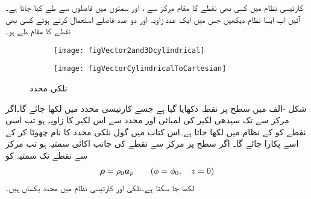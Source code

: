 کارتیسی نظام میں کسی بھی نقطے کا مقام مرکز سے ،  اور  سمتوں میں فاصلوں سے طے کیا جاتا ہے۔آئیں اب ایسا نظام دیکھیں جس میں ایک عدد زاویہ اور دو عدد فاصلے استعمال کرتے ہوئے کسی بھی نقطے کا مقام طے ہو۔
 \begin{figure}
\centering
\begin{subfigure}{0.5\textwidth}
\centering
\texttt{[image: figVector2and3Dcylindrical]}
\end{subfigure}%
%
\begin{subfigure}{0.5\textwidth}
\centering
\texttt{[image: figVectorCylindricalToCartesian]}
\end{subfigure}%
\caption{نلکی محدد}
\label{شکل_سمتیہ_نلکی_محدد}
\end{figure}

شکل -الف میں  سطح پر نقطہ  دکھایا گیا ہے جسے کارتیسی محدد میں  لکھا جائے گا۔اگر مرکز سے  تک سیدھی لکیر کی لمبائی  اور  محدد سے اس لکیر کا زاویہ  ہو تب اسی نقطے
 کو  کے نظام میں  لکھا جاتا ہے۔اس کتاب میں گول نلکی محدد کا نام چھوٹا کر کے اسے  پکارا جائے گا۔ اگر  سطح پر مرکز سے نقطے کی جانب اکائی سمتیہ  ہو تب مرکز سے نقطے تک سمتیہ کو
\begin{align}
{\ensuremath{{\boldsymbol{\rho}}}}=\rho_0 {\boldsymbol{a}}_{\rho} \quad \quad (\phi=\phi_0, \quad   z=0 )
\end{align}
   لکھا جا سکتا ہے۔نلکی  اور کارتیسی نظام میں   محدد یکساں ہیں۔

